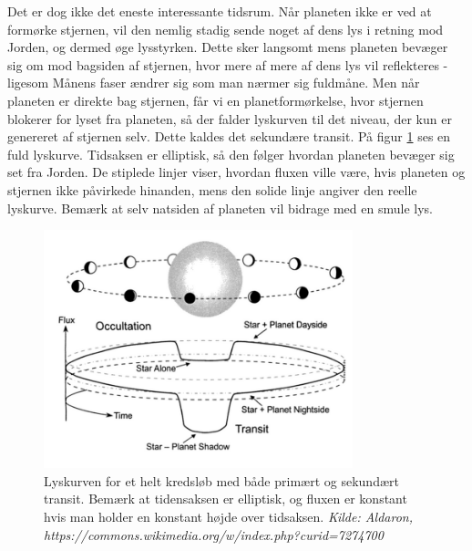 Det er dog ikke det eneste interessante tidsrum. Når planeten ikke er ved at formørke stjernen, vil den nemlig stadig sende noget af dens lys i retning mod Jorden, og dermed øge lysstyrken. %
Dette sker langsomt mens planeten bevæger sig om mod bagsiden af stjernen, hvor mere af mere af dens lys vil reflekteres - ligesom Månens faser ændrer sig som man nærmer sig fuldmåne. Men når planeten er direkte bag stjernen, får vi en planetformørkelse, hvor stjernen blokerer for lyset fra planeten, så der falder lyskurven til det niveau, der kun er genereret af stjernen selv. Dette kaldes det sekundære transit.
%
På figur \ref{fuld_lyskurve} ses en fuld lyskurve. Tidsaksen er elliptisk, så den følger hvordan planeten bevæger sig set fra Jorden. De stiplede linjer viser, hvordan fluxen ville være, hvis planeten og stjernen ikke påvirkede hinanden, mens den solide linje angiver den reelle lyskurve. Bemærk at selv natsiden af planeten vil bidrage med en smule lys. %

\begin{figure}[h!]
    \centering
    \includegraphics[width = 0.8\textwidth]{Astrofysik/billeder/fuld_lyskurve.png}  
    \caption{Lyskurven for et helt kredsløb med både primært og sekundært transit. Bemærk at tidensaksen er elliptisk, og fluxen er konstant hvis man holder en konstant højde over tidsaksen. \emph{Kilde: Aldaron, https://commons.wikimedia.org/w/index.php?curid=7274700}}
    \label{fuld_lyskurve}
\end{figure}

